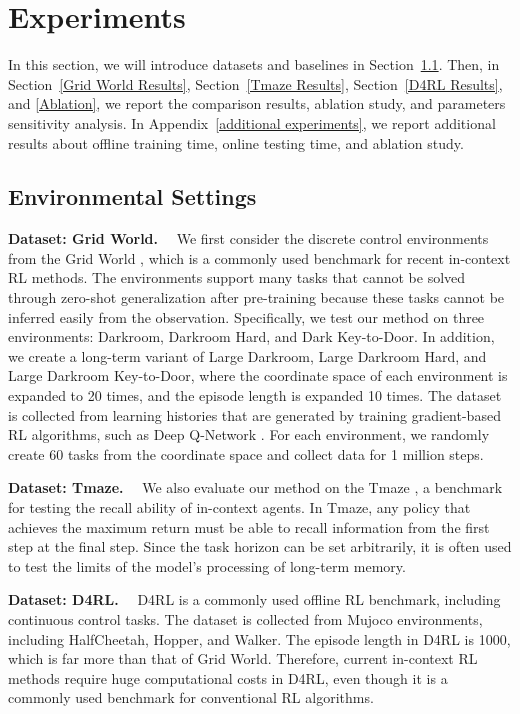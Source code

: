 \section{Experiments}
\label{experiment}

In this section, we will introduce datasets and baselines in Section~\ref{Environmental Settings}.
Then, in Section~\ref{Grid World Results}, Section~\ref{Tmaze Results}, Section~\ref{D4RL Results}, and \ref{Ablation}, we report the comparison results, ablation study, and parameters sensitivity analysis. In Appendix~\ref{additional experiments}, we report additional results about offline training time, online testing time, and ablation study.

\subsection{Environmental Settings}
\label{Environmental Settings}
\noindent\textbf{Dataset: Grid World.}~~
We first consider the discrete control environments from the Grid World \cite{14}, which is a commonly used benchmark for recent in-context RL methods. The environments support many tasks that cannot be solved through zero-shot generalization after pre-training because these tasks cannot be inferred easily from the observation. Specifically, we test our method on three environments: Darkroom, Darkroom Hard, and Dark Key-to-Door. In addition, we create a long-term variant of Large Darkroom, Large Darkroom Hard, and Large Darkroom Key-to-Door, where the coordinate space of each environment is expanded to 20 times, and the episode length is expanded 10 times. The dataset is collected from learning histories that are generated by training gradient-based RL algorithms, such as Deep Q-Network \cite{28}. For each environment, we randomly create 60 tasks from the coordinate space and collect data for 1 million steps. 

\noindent\textbf{Dataset: Tmaze.}~~
We also evaluate our method on the Tmaze \cite{19}, a benchmark for testing the recall ability of in-context agents. In Tmaze, any policy that achieves the maximum return must be able to recall information from the first step at the final step. Since the task horizon can be set arbitrarily, it is often used to test the limits of the model's processing of long-term memory.

\noindent\textbf{Dataset: D4RL.}~~
D4RL \cite{13} is a commonly used offline RL benchmark, including continuous control tasks. 
The dataset is collected from Mujoco environments, including HalfCheetah, Hopper, and Walker. The episode length in D4RL is 1000, which is far more than that of Grid World. Therefore, current in-context RL methods require huge computational costs in D4RL, even though it is a commonly used benchmark for conventional RL algorithms.

